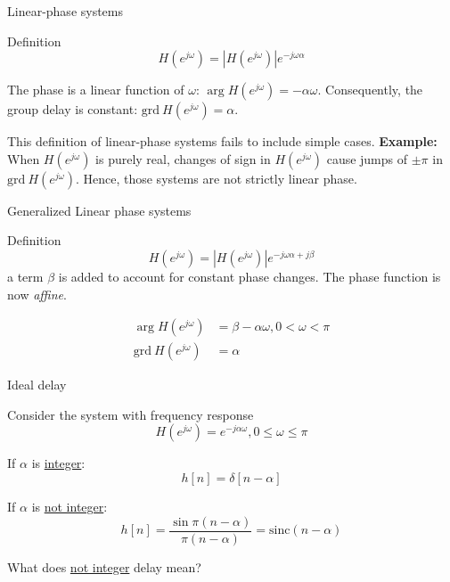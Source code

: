 \documentclass[10pt]{beamer}
\begin{document}
%
\begin{frame}{Linear-phase systems}
\begin{block}{Definition}
	\begin{equation*}
	H(e^{j\omega}) = |H(e^{j\omega})|e^{-j\omega\alpha}
	\end{equation*} 
\end{block}

The phase is a linear function of $\omega$: $\arg H(e^{j\omega}) = -\alpha\omega$. Consequently, the group delay is constant: $\mathrm{grd}~H(e^{j\omega}) = \alpha$.

\vspace{2mm}

This definition of linear-phase systems fails to include simple cases. \textbf{Example:} When  $H(e^{j\omega})$ is purely real, changes of sign in $H(e^{j\omega})$ cause jumps of $\pm\pi$ in $\mathrm{grd}~H(e^{j\omega})$. Hence, those systems are not strictly linear phase.

\end{frame}

\begin{frame}{Generalized Linear phase systems}
\begin{block}{Definition}
	\begin{equation*}
	H(e^{j\omega}) = |H(e^{j\omega})|e^{-j\omega\alpha + j\beta}
	\end{equation*} 
	a term $\beta$ is added to account for constant phase changes. The phase function is now \textit{affine}.
\end{block}

\begin{align*}
\arg H(e^{j\omega}) &= \beta - \alpha\omega, 0 < \omega < \pi \tag{phase}\\
\mathrm{grd}~H(e^{j\omega}) &= \alpha \tag{group delay}
\end{align*}
\end{frame}

\begin{frame}{Ideal delay}

Consider the system with frequency response
\begin{equation*}
H(e^{j\omega}) = e^{-j\alpha\omega}, 0 \leq \omega \leq \pi \tag{ideal delay}
\end{equation*}

If $\alpha$ is \underline{integer}:
\begin{equation*}
h[n] = \delta[n-\alpha] \tag{from DTFT delay property}
\end{equation*}

If $\alpha$ is \underline{not integer}:
\begin{equation*}
h[n] = \frac{\sin \pi(n-\alpha)}{\pi(n-\alpha)} = \mathrm{sinc}(n-\alpha)
\end{equation*}

What does \underline{not integer} delay mean?

\end{frame}
\end{document}
